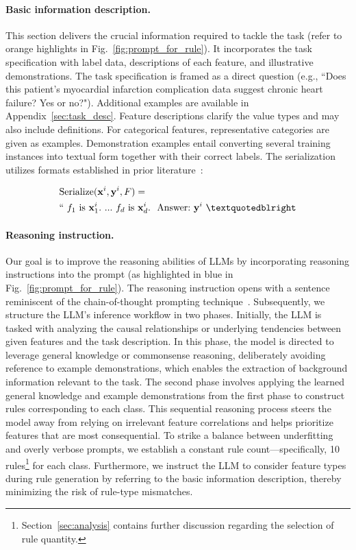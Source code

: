 \vspace*{-0.12in}
\paragraph{Basic information description.} This section delivers the crucial information required to tackle the task (refer to orange highlights in Fig.~\ref{fig:prompt_for_rule}). It incorporates the task specification with label data, descriptions of each feature, and illustrative demonstrations. The task specification is framed as a direct question (e.g., ``Does this patient's myocardial infarction complication data suggest chronic heart failure? Yes or no?"). Additional examples are available in Appendix~\ref{sec:task_desc}. Feature descriptions clarify the value types and may also include definitions. For categorical features, representative categories are given as examples. Demonstration examples entail converting several training instances into textual form together with their correct labels. The serialization utilizes formats established in prior literature~\cite{dinh2022lift,hegselmann2023tabllm}:

\begin{align}
&\text{Serialize}(\mathbf{x}^i,\mathbf{y}^i, F) = \nonumber \\ 
&``\ f_1\ \text{is}\ \mathbf{x}^i_1.\ ... \ f_d\  \text{is}\  \mathbf{x}^i_d.\ \ \text{Answer:}\  \mathbf{y}^i\ ”
\end{align}

\vspace*{-0.12in}
\paragraph{Reasoning instruction.} Our goal is to improve the reasoning abilities of LLMs by incorporating reasoning instructions into the prompt (as highlighted in blue in Fig.~\ref{fig:prompt_for_rule}). The reasoning instruction opens with a sentence reminiscent of the chain-of-thought prompting technique~\cite{wei2022chain}. Subsequently, we structure the LLM's inference workflow in two phases. Initially, the LLM is tasked with analyzing the causal relationships or underlying tendencies between given features and the task description. In this phase, the model is directed to leverage general knowledge or commonsense reasoning, deliberately avoiding reference to example demonstrations, which enables the extraction of background information relevant to the task. The second phase involves applying the learned general knowledge and example demonstrations from the first phase to construct rules corresponding to each class. This sequential reasoning process steers the model away from relying on irrelevant feature correlations and helps prioritize features that are most consequential. To strike a balance between underfitting and overly verbose prompts, we establish a constant rule count—specifically, 10 rules\footnote{Section~\ref{sec:analysis} contains further discussion regarding the selection of rule quantity.} for each class. Furthermore, we instruct the LLM to consider feature types during rule generation by referring to the basic information description, thereby minimizing the risk of rule-type mismatches.

